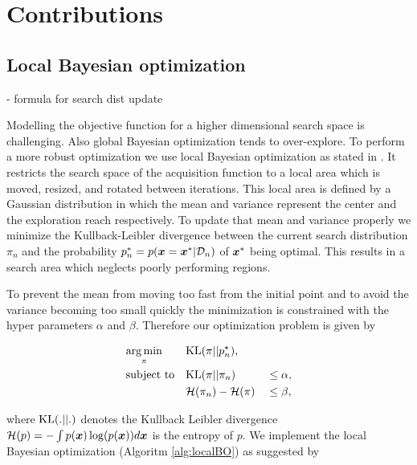 \chapter{Contributions}
\label{chap:contributions}


\section{Local Bayesian optimization}
\label{sec:localBO}
- formula for search dist update

Modelling the objective function for a higher dimensional search space is challenging. Also global Bayesian optimization tends to over-explore. To perform a more robust optimization we use local Bayesian optimization as stated in \cite{akrour2017local}. It restricts the search space of the acquisition function to a local area which is moved, resized, and rotated between iterations. This local area is defined by a Gaussian distribution in which the mean and variance represent the center and the exploration reach respectively. To update that mean and variance properly we minimize the Kullback-Leibler divergence between the current search distribution $\pi_n$ and the probability $p_n^* = p({\boldsymbol{x}}={\boldsymbol{x}}^*|\mathcal{D}_n)$ of ${\boldsymbol{x}}^*$ being optimal. This results in a search area which neglects poorly performing regions.

To prevent the mean from moving too fast from the initial point and to avoid the variance becoming too small quickly the minimization is constrained with the hyper parameters $\alpha$ and $\beta$. Therefore our optimization problem is given by

\begin{align}
    & \underset{\pi}{\arg\min} & & \mathrm{KL}(\pi||p_n^\star),& &\notag\\
    & \text{subject to}
    & & \mathrm{KL}(\pi||\pi_n) & &\leq \alpha,\label{eq:kl:our}\\
    & & &{\cal H}(\pi_n) - {\cal H}(\pi) & &\leq \beta,\label{eq:entropy:our}
\end{align}

where $\mathrm{KL}(.||.)$ denotes the Kullback Leibler divergence $\mathcal{H}(p) = -\int p({\boldsymbol{x}})\log(p({\boldsymbol{x}})) d{\boldsymbol{x}}$ is the entropy of $p$. We implement the local Bayesian optimization (Algoritm \ref{alg:localBO}) as suggested by \cite{akrour2017local}


